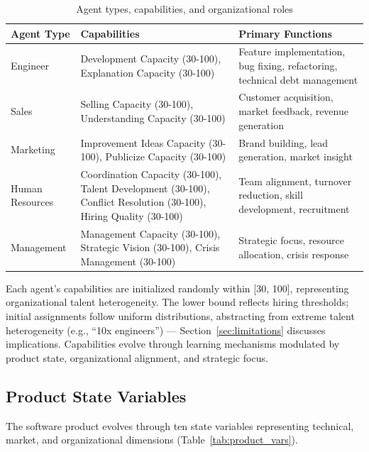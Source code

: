 \documentclass[alpha-refs]{wiley-article}
\begin{document}
\begin{table}[!htbp]
\centering
\caption{Agent types, capabilities, and organizational roles}
\label{tab:agents}
\begin{tabular}{|l|p{5cm}|p{5cm}|}
\hline
\textbf{Agent Type} & \textbf{Capabilities} & \textbf{Primary Functions} \\
\hline
Engineer & Development Capacity (30-100), Explanation Capacity (30-100) & Feature implementation, bug fixing, refactoring, technical debt management \\
\hline
Sales & Selling Capacity (30-100), Understanding Capacity (30-100) & Customer acquisition, market feedback, revenue generation \\
\hline
Marketing & Improvement Ideas Capacity (30-100), Publicize Capacity (30-100) & Brand building, lead generation, market insight \\
\hline
Human Resources & Coordination Capacity (30-100), Talent Development (30-100), Conflict Resolution (30-100), Hiring Quality (30-100) & Team alignment, turnover reduction, skill development, recruitment \\
\hline
Management & Management Capacity (30-100), Strategic Vision (30-100), Crisis Management (30-100) & Strategic focus, resource allocation, crisis response \\
\hline
\end{tabular}
\end{table}

Each agent's capabilities are initialized randomly within [30, 100], representing organizational talent heterogeneity. The lower bound reflects hiring thresholds; initial assignments follow uniform distributions, abstracting from extreme talent heterogeneity (e.g., ``10x engineers'') — Section~\ref{sec:limitations} discusses implications. Capabilities evolve through learning mechanisms modulated by product state, organizational alignment, and strategic focus.

\subsection{Product State Variables}

The software product evolves through ten state variables representing technical, market, and organizational dimensions (Table~\ref{tab:product_vars}).
\end{document}
